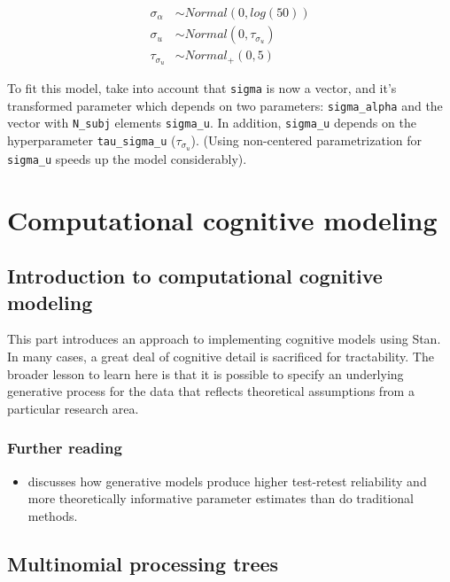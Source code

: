 \documentclass[12pt,]{krantz}
\providecommand{\tightlist}{%
  \setlength{\itemsep}{0pt}\setlength{\parskip}{0pt}}
\theoremstyle{definition}
\theoremstyle{definition}
\theoremstyle{definition}
\theoremstyle{remark}
\begin{document}
\begin{equation}
\begin{aligned}
  \sigma_\alpha &\sim Normal(0,log(50))\\
  \sigma_u &\sim Normal(0, \tau_{\sigma_u}) \\
  \tau_{\sigma_u} &\sim Normal_+(0, 5)
\end{aligned}
\end{equation}

To fit this model, take into account that \texttt{sigma} is now a
vector, and it's transformed parameter which depends on two parameters:
\texttt{sigma\_alpha} and the vector with \texttt{N\_subj} elements
\texttt{sigma\_u}. In addition, \texttt{sigma\_u} depends on the
hyperparameter \texttt{tau\_sigma\_u} (\(\tau_{\sigma_u}\)). (Using
non-centered parametrization for \texttt{sigma\_u} speeds up the model
considerably).

\part{Computational cognitive
modeling}\label{part-computational-cognitive-modeling}

\chapter{Introduction to computational cognitive
modeling}\label{introduction-to-computational-cognitive-modeling}

This part introduces an approach to implementing cognitive models using
Stan. In many cases, a great deal of cognitive detail is sacrificed for
tractability. The broader lesson to learn here is that it is possible to
specify an underlying generative process for the data that reflects
theoretical assumptions from a particular research area.

\section{Further reading}\label{further-reading-10}

\begin{itemize}
\tightlist
\item
  \citet{haines2020learning} discusses how generative models produce
  higher test-retest reliability and more theoretically informative
  parameter estimates than do traditional methods.
\end{itemize}

\chapter{Multinomial processing trees}\label{ch:MPT}
\end{document}

